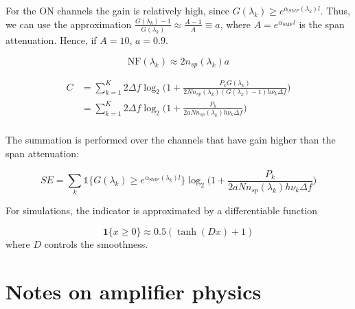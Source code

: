 \documentclass[a4paper]{article}
\begin{document}
For the ON channels the gain is relatively high, since $G(\lambda_k) \geq e^{\alpha_{SMF}(\lambda_k)l}$. Thus, we can use the approximation $\frac{G(\lambda_k)-1}{G(\lambda_k)} \approx \frac{A-1}{A} \equiv a$, where $A = e^{\alpha_{\text{SMF}}l}$ is the span attenuation. Hence, if $A = 10$, $a = 0.9$. 

\begin{equation} \label{eq:NF}
\mathrm{NF}(\lambda_k) \approx 2n_{sp}(\lambda_k)a
\end{equation}

\begin{align} \nonumber
C &= \sum_{k = 1}^{K} 2\Delta f\log_2\Bigg(1 + \frac{P_kG(\lambda_k)}{2Nn_{sp}(\lambda_k)(G(\lambda_k) - 1)h\nu_k\Delta f}\Bigg) \\
&= \sum_{k = 1}^{K} 2\Delta f\log_2\Bigg(1 + \frac{P_k}{2aNn_{sp}(\lambda_k)h\nu_k\Delta f}\Bigg) \\
\end{align}


The summation is performed over the channels that have gain higher than the span attenuation:

\begin{equation}
SE =\sum_{k} \mathds{1}\{G(\lambda_k) \geq e^{\alpha_{\text{SMF}}(\lambda_k)l}\}\log_2\bigg(1 + \frac{P_k}{2aNn_{sp}(\lambda_k)h\nu_k\Delta f}\bigg) 
\end{equation}

For simulations, the indicator is approximated by a differentiable function

\begin{equation}
	\bm{1}\{x \geq 0\} \approx 0.5(\tanh(Dx) + 1)
\end{equation}
where $D$ controls the smoothness.

\newpage
\section{Notes on amplifier physics}
\end{document}
